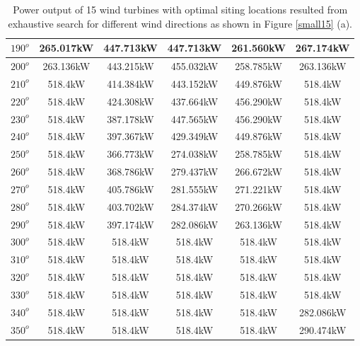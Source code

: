 \begin{table}[H]
\begin{tabular}{|c|c|c|c|c|c|}
        		$190^o$	& 265.017kW	& 447.713kW	& 447.713kW	& 261.560kW	& 267.174kW	\\ \hline
        		$200^o$	& 263.136kW	& 443.215kW	& 455.032kW	& 258.785kW	& 263.136kW	\\ \hline
        		$210^o$	& 518.4kW	& 414.384kW	& 443.152kW	& 449.876kW	& 518.4kW	\\ \hline
        		$220^o$	& 518.4kW	& 424.308kW	& 437.664kW	& 456.290kW	& 518.4kW	\\ \hline
        		$230^o$	& 518.4kW	& 387.178kW	& 447.565kW	& 456.290kW	& 518.4kW	\\ \hline
        		$240^o$	& 518.4kW	& 397.367kW	& 429.349kW	& 449.876kW	& 518.4kW	\\ \hline
        		$250^o$	& 518.4kW	& 366.773kW	& 274.038kW	& 258.785kW	& 518.4kW	\\ \hline
        		$260^o$	& 518.4kW	& 368.786kW	& 279.437kW	& 266.672kW	& 518.4kW	\\ \hline
        		$270^o$	& 518.4kW	& 405.786kW	& 281.555kW	& 271.221kW	& 518.4kW	\\ \hline
        		$280^o$	& 518.4kW	& 403.702kW	& 284.374kW	& 270.266kW	& 518.4kW	\\ \hline
        		$290^o$	& 518.4kW	& 397.174kW	& 282.086kW	& 263.136kW	& 518.4kW	\\ \hline
        		$300^o$	& 518.4kW	& 518.4kW	& 518.4kW	& 518.4kW	& 518.4kW	\\ \hline
        		$310^o$	& 518.4kW	& 518.4kW	& 518.4kW	& 518.4kW	& 518.4kW	\\ \hline
        		$320^o$	& 518.4kW	& 518.4kW	& 518.4kW	& 518.4kW	& 518.4kW	\\ \hline
        		$330^o$	& 518.4kW	& 518.4kW	& 518.4kW	& 518.4kW	& 518.4kW	\\ \hline
        		$340^o$	& 518.4kW	& 518.4kW	& 518.4kW	& 518.4kW	& 282.086kW	\\ \hline
        		$350^o$	& 518.4kW	& 518.4kW	& 518.4kW	& 518.4kW	& 290.474kW	\\ \hline
        	\end{tabular}
        	\caption{Power output of 15 wind turbines with optimal siting locations resulted from exhaustive search for different wind directions as shown in Figure \ref{small15} (a).}
        	\label{table15a}
        \end{table}
